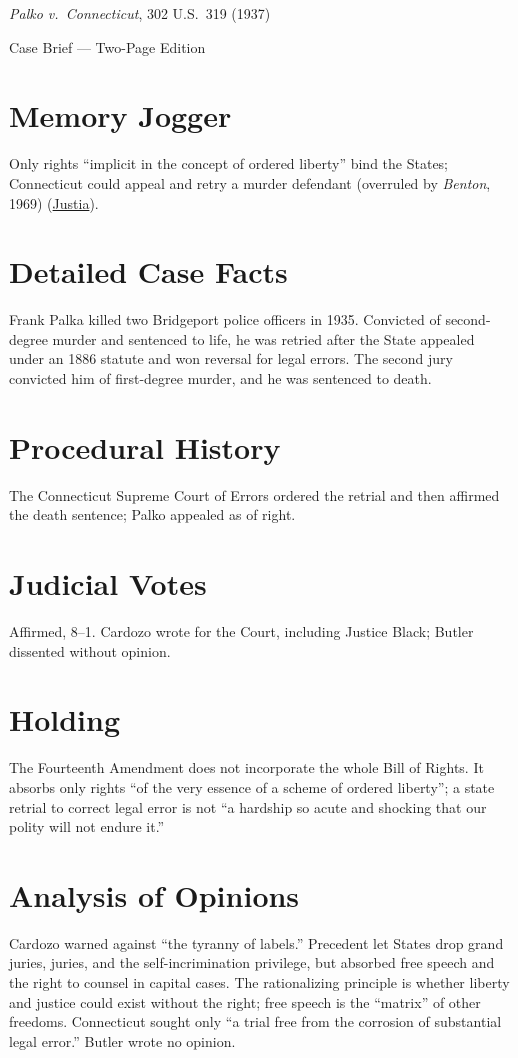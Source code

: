 \documentclass[12pt]{article}
\begin{document}
\begin{center}
{\LARGE \textit{Palko v.\ Connecticut}, 302 U.S.\ 319 (1937)\par}
\vspace{0.5em}
{\large Case Brief --- Two-Page Edition\par}
\end{center}

\section{Memory Jogger}
Only rights ``implicit in the concept of ordered liberty'' bind the States; Connecticut could appeal and retry a murder defendant (overruled by \textit{Benton}, 1969) (\href{https://supreme.justia.com/cases/federal/us/302/319/}{Justia}).

\section{Detailed Case Facts}
Frank Palka killed two Bridgeport police officers in 1935. Convicted of second-degree murder and sentenced to life, he was retried after the State appealed under an 1886 statute and won reversal for legal errors. The second jury convicted him of first-degree murder, and he was sentenced to death.

\section{Procedural History}
The Connecticut Supreme Court of Errors ordered the retrial and then affirmed the death sentence; Palko appealed as of right.

\section{Judicial Votes}
Affirmed, 8--1. Cardozo wrote for the Court, including Justice Black; Butler dissented without opinion.

\section{Holding}
The Fourteenth Amendment does not incorporate the whole Bill of Rights. It absorbs only rights ``of the very essence of a scheme of ordered liberty''; a state retrial to correct legal error is not ``a hardship so acute and shocking that our polity will not endure it.''

\section{Analysis of Opinions}
Cardozo warned against ``the tyranny of labels.'' Precedent let States drop grand juries, juries, and the self-incrimination privilege, but absorbed free speech and the right to counsel in capital cases. The rationalizing principle is whether liberty and justice could exist without the right; free speech is the ``matrix'' of other freedoms. Connecticut sought only ``a trial free from the corrosion of substantial legal error.'' Butler wrote no opinion.
\end{document}
